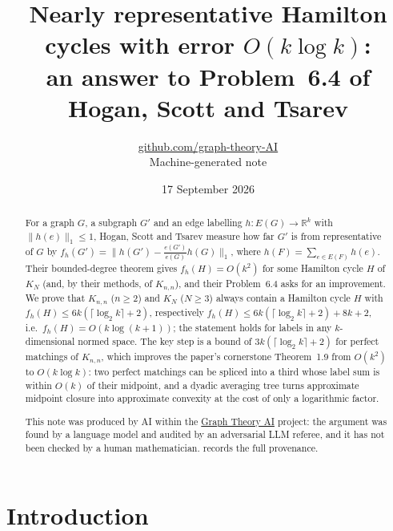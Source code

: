 \documentclass[11pt,a4paper]{article}
\title{Nearly representative Hamilton cycles with error $O(k\log k)$:\\ an answer to Problem~6.4 of Hogan, Scott and Tsarev}
\author{\href{https://github.com/graph-theory-AI}{github.com/graph-theory-AI}\\[2pt] \normalsize Machine-generated note}
\date{17 September 2026}
\theoremstyle{plain}
\theoremstyle{definition}
\theoremstyle{remark}
\newcommand{\R}{\mathbb R}
\begin{document}
\maketitle

\begin{abstract}
For a graph $G$, a subgraph $G'$ and an edge labelling $h\colon E(G)\to\R^k$ with $\|h(e)\|_1\le1$, Hogan, Scott and Tsarev measure how far $G'$ is from representative of $G$ by $f_h(G')=\|h(G')-\frac{e(G')}{e(G)}h(G)\|_1$, where $h(F)=\sum_{e\in E(F)}h(e)$. Their bounded-degree theorem gives $f_h(H)=O(k^2)$ for some Hamilton cycle $H$ of $K_N$ (and, by their methods, of $K_{n,n}$), and their Problem~6.4 asks for an improvement. We prove that $K_{n,n}$ ($n\ge2$) and $K_N$ ($N\ge3$) always contain a Hamilton cycle $H$ with $f_h(H)\le 6k(\lceil\log_2k\rceil+2)$, respectively $f_h(H)\le 6k(\lceil\log_2k\rceil+2)+8k+2$, i.e.\ $f_h(H)=O(k\log(k+1))$; the statement holds for labels in any $k$-dimensional normed space. The key step is a bound of $3k(\lceil\log_2 k\rceil+2)$ for perfect matchings of $K_{n,n}$, which improves the paper's cornerstone Theorem~1.9 from $O(k^2)$ to $O(k\log k)$: two perfect matchings can be spliced into a third whose label sum is within $O(k)$ of their midpoint, and a dyadic averaging tree turns approximate midpoint closure into approximate convexity at the cost of only a logarithmic factor.

\medskip\noindent\small
This note was produced by AI within the \href{https://github.com/graph-theory-AI/Graph-Theory-LLM-Proofs}{Graph Theory AI} project:
the argument was found by a language model and audited by an adversarial LLM
referee, and it has not been checked by a human mathematician.
 records the full provenance.
\end{abstract}

\section{Introduction}
\end{document}

